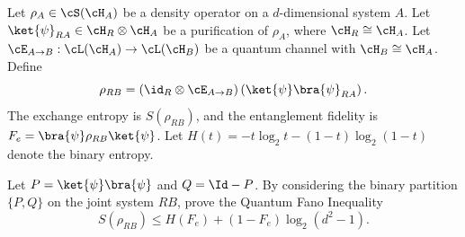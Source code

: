 Let $\rho_A\in \cS(\cH_A)$ be a density operator on a $d$-dimensional system $A$. Let $\ket{\psi}_{RA}\in \cH_R\otimes \cH_A$ be a purification of $\rho_A$, where $\cH_R\cong \cH_A$. Let $\cE_{A\to B}:\cL(\cH_A)\to \cL(\cH_B)$ be a quantum channel with $\cH_B\cong \cH_A$. Define
$$
\rho_{RB}
=
(\id_R\otimes \cE_{A\to B})
\left(
\ket{\psi}\bra{\psi}_{RA}
\right).
$$
The exchange entropy is $S(\rho_{RB})$, and the entanglement fidelity is $F_e=\bra{\psi}\rho_{RB}\ket{\psi}$.
Let $H(t)=-t\log_2 t-(1-t)\log_2(1-t)$ denote the binary entropy.

Let $P=\ket{\psi}\bra{\psi}$ and $Q=\Id-P$. By considering the binary partition $\{P,Q\}$ on the joint system $RB$, prove the Quantum Fano Inequality
$$
S(\rho_{RB})
\leq
H(F_e)
+
(1-F_e)\log_2(d^2-1).
$$
